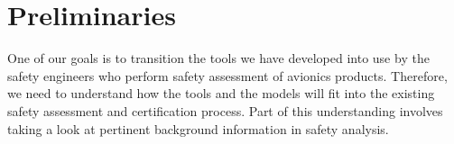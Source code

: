 \section{Preliminaries}
\label{sec:background}
One of our goals is to transition the tools we have developed into use by the safety engineers who perform safety assessment of avionics products. Therefore, we need to understand how the tools and the models will fit into the existing safety assessment and certification process. Part of this understanding involves taking a look at pertinent background information in safety analysis. 






